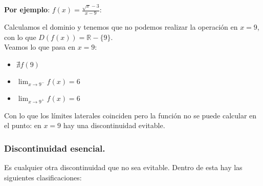 \documentclass[a4paper,11pt,answers]{exam}
\begin{document}
\textbf{Por ejemplo}: $f(x) = \frac{\sqrt{x} - 3}{x - 9}$:\\
\begin{solution}
Calculamos el dominio y tenemos que no podemos realizar la operación en $x=9$, con lo que $D(f(x)) = \mathbb{R}-\{9\}$.\\
Veamos lo que pasa en $x=9$:
\begin{itemize}
	\item $\nexists f(9)$
	\item $\lim_{x \to 9^-} f(x) = 6$
	\item $\lim_{x \to 9^+} f(x) = 6$
\end{itemize}
Con lo que los límites laterales coinciden pero la función no se puede calcular en el punto: en $x=9$ hay una discontinuidad evitable.
\end{solution}
\subsubsection{Discontinuidad esencial.}
Es cualquier otra discontinuidad que no sea evitable. Dentro de esta hay las siguientes clasificaciones:
\end{document}
